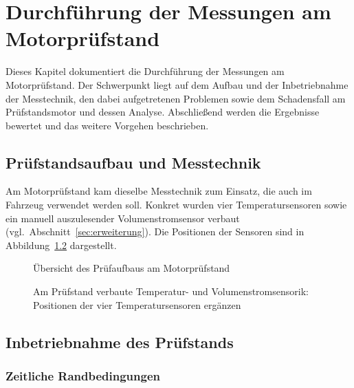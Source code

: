 \chapter{Durchführung der Messungen am Motorprüfstand}
\label{chap:motorpruefstand}

Dieses Kapitel dokumentiert die Durchführung der Messungen am Motorprüfstand. Der Schwerpunkt liegt auf dem Aufbau und der Inbetriebnahme der Messtechnik, den dabei aufgetretenen Problemen sowie dem Schadensfall am Prüfstandsmotor und dessen Analyse. Abschließend werden die Ergebnisse bewertet und das weitere Vorgehen beschrieben.

 
\section{Prüfstandsaufbau und Messtechnik}
\label{sec:pruefstandsaufbau}


Am Motorprüfstand kam dieselbe Messtechnik zum Einsatz, die auch im Fahrzeug verwendet werden soll. Konkret wurden vier Temperatursensoren sowie ein manuell auszulesender Volumenstromsensor verbaut (vgl.\ Abschnitt~\ref{sec:erweiterung}). Die Positionen der Sensoren sind in Abbildung~\ref{fig:pruefstand_sensorik} dargestellt.

\begin{figure}[htbp]
    \centering
    \caption{Übersicht des Prüfaufbaus am Motorprüfstand}
    \label{fig:pruefstand_uebersicht}
\end{figure}

\begin{figure}[htbp]
    \centering
    \caption{Am Prüfstand verbaute Temperatur- und Volumenstromsensorik: Positionen der vier Temperatursensoren ergänzen}
    \label{fig:pruefstand_sensorik}
\end{figure}

 
\section{Inbetriebnahme des Prüfstands}
\label{sec:inbetriebnahme}
 

\subsection{Zeitliche Randbedingungen}
\label{subsec:zeitliche_randbedingungen}

